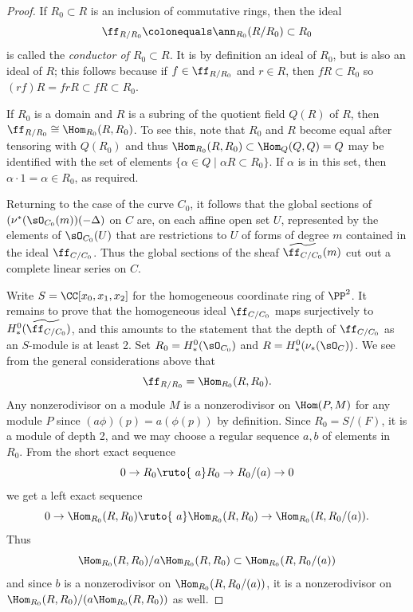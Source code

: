\begin{proof}
If $R_{0}\subset R$ is an inclusion of commutative rings, then the ideal
$$\ff_{R/R_{0}} \colonequals  \ann_{R_{0}}(R/R_{0})\subset R_{0}$$ 
is called the \emph{conductor of $R_{0}\subset R$.}
%
It is by
definition an ideal of $R_{0}$, but is also an ideal of $R$; this follows
because if $f\in \ff_{R/R_{0}}$ and $r\in R$, then $fR\subset R_{0}$ so
 $(rf)R = frR \subset fR \subset R_{0}$.

If $R_{0}$ is a domain and $R$ is a subring of the quotient field $Q(R)$
of $R$, then
 $\ff_{R/R_{0}} \cong \Hom_{R_{0}}(R, R_{0})$. To see this, note that
 $R_{0}$ and $R$ become
 equal after tensoring with $Q(R_{0})$ and thus
 $\Hom_{R_{0}}(R,R_{0}) \subset \Hom_{Q}(Q,Q) = Q$
 may be identified
 with the set of elements $\{\alpha\in Q\mid \alpha R \subset R_{0}\}$. If
 $\alpha$ is in this set, then
  $\alpha\cdot 1 = \alpha \in R_{0}$, as required.

Returning to the case of the curve $C_{0}$, it follows that the global
sections of $(\nu^{*}(\sO_{C_{0}}(m))( -\Delta)$ on $C$
are, on each affine open set $U$, represented by the elements of
$\sO_{C_{0}}(U)$ that  are restrictions to $U$
of forms of degree $m$ contained in
the ideal $\ff_{C/C_{0}}$. Thus
the global sections of the sheaf $\widetilde{\ff_{C/C_{0}}}(m)$ cut out
a complete linear series on $C$.

Write $S =\CC[x_{0}, x_{1}, x_{2}]$ for the homogeneous coordinate ring
of $\PP^{2}$.
It remains to prove that the homogeneous ideal $\ff_{C/C_{0}}$ maps
surjectively to $H^{0}_{*}(\widetilde{\ff_{C/C_{0}}})$, and this amounts
to the
statement that the depth of $\ff_{C/C_{0}}$ as an $S$-module is 
at least 2.
Set $R_{0} = H^{0}_{*}(\sO_{C_{0}})$ and $R = H^{0}_{*}(\nu_{*} (\sO_{C}))$.
We see from the general considerations above that
$$
\ff_{R/R_{0}} = \Hom_{R_{0}}(R, R_{0}).
$$
Any nonzerodivisor on a module $M$
is a nonzerodivisor on $\Hom(P, M)$ for any module $P$ since $(a\phi)(p)
= a(\phi(p))$ by definition.
Since $R_{0} = S/(F)$, it is a module of depth 2, and we may choose a
regular sequence
$a,b$ of elements in~$R_{0}$. From the short exact sequence
$$
0\to R_{0}\ruto {\ a} R_{0}\to R_{0}/(a) \to 0
$$
we get a left exact sequence
$$
0\to \Hom_{R_{0}}(R,R_{0})\ruto {\ a} \Hom_{R_{0}}(R,R_{0})\to
\Hom_{R_{0}}(R,R_{0}/(a)).
$$
Thus
$$
\Hom_{R_{0}}(R,R_{0})/a\Hom_{R_{0}}(R,R_{0}) \subset
\Hom_{R_{0}}(R,R_{0}/(a))
$$
and since $b$ is a nonzerodivisor on $\Hom_{R_{0}}(R,R_{0}/(a))$, it is
a nonzerodivisor
on $\Hom_{R_{0}}(R,R_{0})/(a\Hom_{R_{0}}(R,R_{0}))$ as well.
\end{proof}

